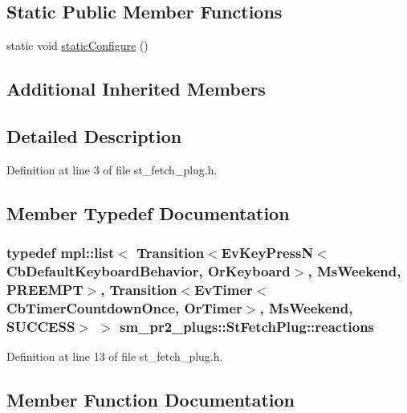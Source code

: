 \subsection*{Static Public Member Functions}
\begin{DoxyCompactItemize}
\item 
static void \hyperlink{structsm__pr2__plugs_1_1StFetchPlug_a61bddcfc32e45d16b7b6b6e637f328cc}{static\+Configure} ()
\end{DoxyCompactItemize}
\subsection*{Additional Inherited Members}


\subsection{Detailed Description}


Definition at line 3 of file st\+\_\+fetch\+\_\+plug.\+h.



\subsection{Member Typedef Documentation}
\subsubsection[{\texorpdfstring{reactions}{reactions}}]{\setlength{\rightskip}{0pt plus 5cm}typedef mpl\+::list$<$ Transition$<$Ev\+Key\+PressN$<$Cb\+Default\+Keyboard\+Behavior, {\bf Or\+Keyboard}$>$, {\bf Ms\+Weekend}, {\bf P\+R\+E\+E\+M\+PT}$>$, Transition$<$Ev\+Timer$<$Cb\+Timer\+Countdown\+Once, {\bf Or\+Timer}$>$, {\bf Ms\+Weekend}, {\bf S\+U\+C\+C\+E\+SS}$>$ $>$ {\bf sm\+\_\+pr2\+\_\+plugs\+::\+St\+Fetch\+Plug\+::reactions}}\hypertarget{structsm__pr2__plugs_1_1StFetchPlug_aa834b55cd5b7f1d8056ad8094025fe1f}{}\label{structsm__pr2__plugs_1_1StFetchPlug_aa834b55cd5b7f1d8056ad8094025fe1f}


Definition at line 13 of file st\+\_\+fetch\+\_\+plug.\+h.



\subsection{Member Function Documentation}
